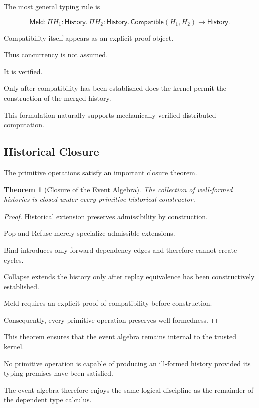 \documentclass[12pt,oneside]{article}
\newtheorem{theorem}{Theorem}[section]
\theoremstyle{definition}
\theoremstyle{remark}
\newcommand{\Meld}{\mathsf{Meld}}
\begin{document}
The most general typing rule is

\[
\Meld
:
\Pi
H_1:\mathsf{History}.
\,
\Pi
H_2:\mathsf{History}.
\,
\mathsf{Compatible}(H_1,H_2)
\rightarrow
\mathsf{History}.
\]

Compatibility itself appears as an explicit proof object.

Thus concurrency is not assumed.

It is verified.

Only after compatibility has been established does the kernel permit the
construction of the merged history.

This formulation naturally supports mechanically verified distributed
computation.

\subsection{Historical Closure}

The primitive operations satisfy an important closure theorem.

\begin{theorem}[Closure of the Event Algebra]

The collection of well-formed histories is closed under every primitive
historical constructor.

\end{theorem}

\begin{proof}

Historical extension preserves admissibility by construction.

Pop and Refuse merely specialize admissible extensions.

Bind introduces only forward dependency edges and therefore cannot create
cycles.

Collapse extends the history only after replay equivalence has been
constructively established.

Meld requires an explicit proof of compatibility before construction.

Consequently, every primitive operation preserves well-formedness.

\end{proof}

This theorem ensures that the event algebra remains internal to the trusted
kernel.

No primitive operation is capable of producing an ill-formed history provided
its typing premises have been satisfied.

The event algebra therefore enjoys the same logical discipline as the remainder
of the dependent type calculus.
\end{document}
